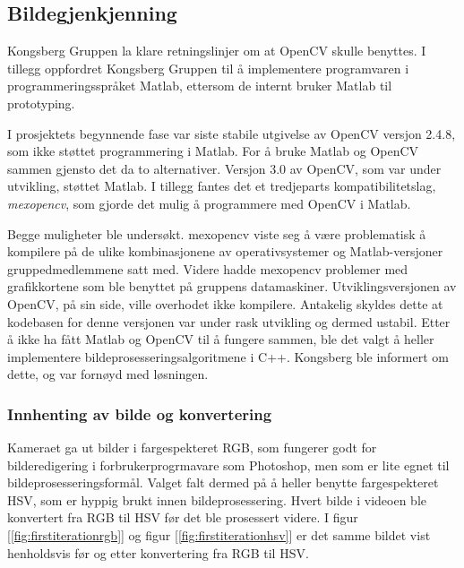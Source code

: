 \subsection{Bildegjenkjenning}

Kongsberg Gruppen la klare retningslinjer om at OpenCV skulle benyttes. I tillegg oppfordret Kongsberg Gruppen til å implementere programvaren i programmeringsspråket Matlab, ettersom de internt bruker Matlab til prototyping.

I prosjektets begynnende fase var siste stabile utgivelse av OpenCV versjon 2.4.8, som ikke støttet programmering i Matlab. For å bruke Matlab og OpenCV sammen gjensto det da to alternativer. Versjon 3.0 av OpenCV, som var under utvikling, støttet Matlab. I tillegg fantes det et tredjeparts kompatibilitetslag, \emph{mexopencv}, som gjorde det mulig å programmere med OpenCV i Matlab.

Begge muligheter ble undersøkt. mexopencv viste seg å være problematisk å kompilere på de ulike kombinasjonene av operativsystemer og Matlab-versjoner gruppedmedlemmene satt med. Videre hadde mexopencv problemer med grafikkortene som ble benyttet på gruppens datamaskiner. Utviklingsversjonen av OpenCV, på sin side, ville overhodet ikke kompilere. Antakelig skyldes dette at kodebasen for denne versjonen var under rask utvikling og dermed ustabil. Etter å ikke ha fått Matlab og OpenCV til å fungere sammen, ble det valgt å heller implementere bildeprosesseringsalgoritmene i C++. Kongsberg ble informert om dette, og var fornøyd med løsningen.

\subsubsection{Innhenting av bilde og konvertering}

Kameraet ga ut bilder i fargespekteret RGB, som fungerer godt for bilderedigering i forbrukerprogrmavare som Photoshop, men som er lite egnet til bildeprosesseringsformål. Valget falt dermed på å heller benytte fargespekteret HSV, som er hyppig brukt innen bildeprosessering. Hvert bilde i videoen ble konvertert fra RGB til HSV før det ble prosessert videre. I figur [\ref{fig:firstiterationrgb}] og figur [\ref{fig:firstiterationhsv}] er det samme bildet vist henholdsvis før og etter konvertering fra RGB til HSV.

